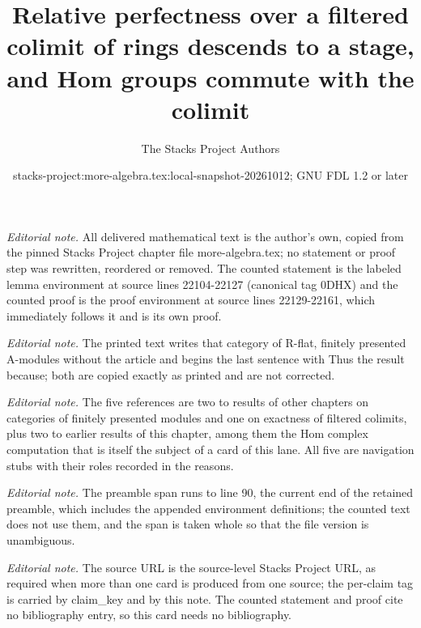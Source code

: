 \documentclass[10pt,a4paper]{amsart}
\title{Relative perfectness over a filtered colimit of rings descends to a stage, and Hom groups commute with the colimit}
\author{The Stacks Project Authors}
\date{stacks-project:more-algebra.tex:local-snapshot-20261012; GNU FDL 1.2 or later}
\theoremstyle{plain}
\theoremstyle{definition}
\theoremstyle{remark}
\numberwithin{equation}{subsection}
\begin{document}
\maketitle
\setcounter{subsection}{1}
\noindent\textit{Editorial note.} All delivered mathematical text is the author's own, copied from the pinned Stacks Project chapter file more-algebra.tex; no statement or proof step was rewritten, reordered or removed. The counted statement is the labeled lemma environment at source lines 22104-22127 (canonical tag 0DHX) and the counted proof is the proof environment at source lines 22129-22161, which immediately follows it and is its own proof.\par\medskip
\noindent\textit{Editorial note.} The printed text writes that category of R-flat, finitely presented A-modules without the article and begins the last sentence with Thus the result because; both are copied exactly as printed and are not corrected.\par\medskip
\noindent\textit{Editorial note.} The five references are two to results of other chapters on categories of finitely presented modules and one on exactness of filtered colimits, plus two to earlier results of this chapter, among them the Hom complex computation that is itself the subject of a card of this lane. All five are navigation stubs with their roles recorded in the reasons.\par\medskip
\noindent\textit{Editorial note.} The preamble span runs to line 90, the current end of the retained preamble, which includes the appended environment definitions; the counted text does not use them, and the span is taken whole so that the file version is unambiguous.\par\medskip
\noindent\textit{Editorial note.} The source URL is the source-level Stacks Project URL, as required when more than one card is produced from one source; the per-claim tag is carried by claim\_key and by this note. The counted statement and proof cite no bibliography entry, so this card needs no bibliography.\par\medskip
\end{document}
